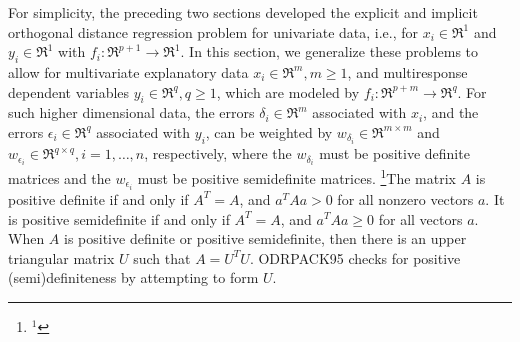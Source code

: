 \medskip
\noindent For simplicity, the preceding two sections developed the explicit and
implicit orthogonal distance regression problem for univariate data,
i.e., for $x_{i}\in\Re^1$ and $y_{i}\in\Re^1$ with
$f_{i}:\Re^{p+1}\rightarrow\Re^1$. In this section, we generalize these problems to allow for multivariate explanatory data $x_{i}\in\Re^{m}, m\ge1$, and multiresponse dependent variables $y_{i}\in\Re^{q},q\ge1$, which are modeled by
$f_{i}:\Re^{p+m}\rightarrow\Re^q$. For such higher dimensional data, the errors $\delta_{i}\in\Re^m$ associated with $x_i$, and the errors
$\epsilon_{i}\in\Re^q$ associated with $y_i$, can be weighted by $w_{\delta_{i}}\in\Re^{m\times m}$ and $w_{\epsilon_{i}}\in\Re^{q\times q},i=1,\ldots,n$,
respectively, where the $w_{\delta_{i}}$ must be positive definite matrices and the $w_{\epsilon_{i}}$ must be positive semidefinite matrices.
\footnote{$^1$}{\rmVIII The
matrix $A$ is {\itVIII positive definite} if and only if $A^{T}=A$, and
$a^{T}Aa>0$ for all nonzero vectors $a$. It is {\itVIII positive 
semidefinite} if and only if $A^{T}=A$, and $a^{T}Aa\ge0$ for all vectors
$a$. When $A$ is positive definite or positive semidefinite, then there
is an upper triangular matrix $U$ such that $A=U^{T}U$. ODRPACK95 checks
for positive (semi)definiteness by attempting to form $U$.}

